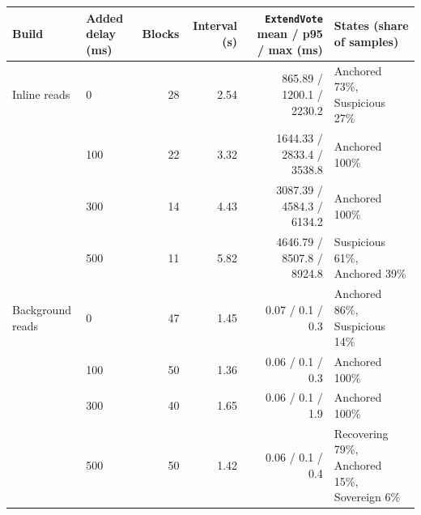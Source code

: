\begin{tabular}{@{}llrrrl@{}}
\toprule
\textbf{Build} & \textbf{Added delay (ms)} & \textbf{Blocks} & \textbf{Interval (s)} & \texttt{ExtendVote} mean / p95 / max (ms) & \textbf{States (share of samples)} \\
\midrule
Inline reads & 0 & 28 & 2.54 & 865.89 / 1200.1 / 2230.2 & Anchored 73\%, Suspicious 27\% \\
 & 100 & 22 & 3.32 & 1644.33 / 2833.4 / 3538.8 & Anchored 100\% \\
 & 300 & 14 & 4.43 & 3087.39 / 4584.3 / 6134.2 & Anchored 100\% \\
 & 500 & 11 & 5.82 & 4646.79 / 8507.8 / 8924.8 & Suspicious 61\%, Anchored 39\% \\
\midrule
Background reads & 0 & 47 & 1.45 & 0.07 / 0.1 / 0.3 & Anchored 86\%, Suspicious 14\% \\
 & 100 & 50 & 1.36 & 0.06 / 0.1 / 0.3 & Anchored 100\% \\
 & 300 & 40 & 1.65 & 0.06 / 0.1 / 1.9 & Anchored 100\% \\
 & 500 & 50 & 1.42 & 0.06 / 0.1 / 0.4 & Recovering 79\%, Anchored 15\%, Sovereign 6\% \\
\bottomrule
\end{tabular}
